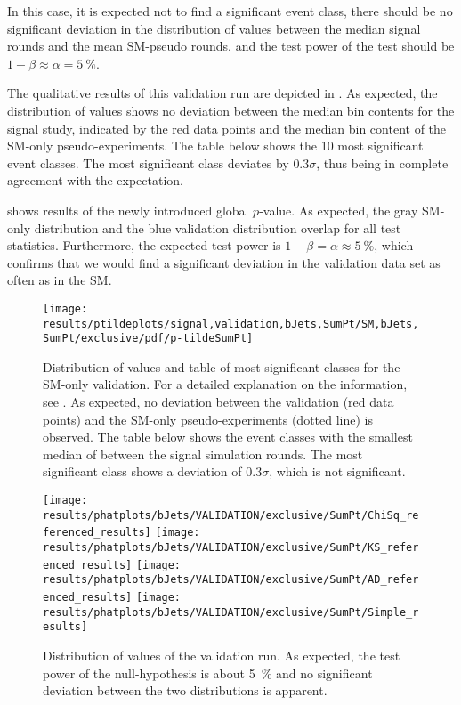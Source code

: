 In this case, it is expected not to find a significant event class, there should be no significant deviation in the distribution of \ptilde values between the median signal rounds and the mean \ac{SM}-pseudo rounds, and the test power of the \phat test should be $1 - \beta \approx \alpha = \SI{5}{\percent}$.

The qualitative results of this validation run are depicted in . As expected, the distribution of \ptilde values shows no deviation between the median bin contents for the signal study, indicated by the red data points and the median bin content of the \ac{SM}-only pseudo-experiments. The table below shows the \num{10} most significant event classes. The most significant class deviates by $\num{0.3}\sigma$, thus being in complete agreement with the expectation. 

 shows results of the newly introduced global $p$-value. As expected, the gray \ac{SM}-only distribution and the blue validation distribution overlap for all test statistics. Furthermore, the expected test power is $1 - \beta = \alpha \approx \SI{5}{\percent}$, which confirms that we would find a significant deviation in the validation data set as often as in the \ac{SM}.

\begin{figure}
    \centering
    \texttt{[image: results/ptildeplots/signal,validation,bJets,SumPt/SM,bJets,SumPt/exclusive/pdf/p-tildeSumPt]}
    {
        
    }
    \caption{Distribution of \ptilde values and table of most significant classes for the \ac{SM}-only validation. For a detailed explanation on the information, see . As expected, no deviation between the validation (red data points) and the \ac{SM}-only pseudo-experiments (dotted line) is observed. 
    The table below shows the event classes with the smallest median of \ptilde between the signal simulation rounds. The most significant class shows a deviation of $\num{0.3}\sigma$, which is not significant.}
    \label{fig:result_validation_ptilde}
\end{figure}

\begin{figure}
    \centering
    \texttt{[image: results/phatplots/bJets/VALIDATION/exclusive/SumPt/ChiSq\_referenced\_results]}
    \texttt{[image: results/phatplots/bJets/VALIDATION/exclusive/SumPt/KS\_referenced\_results]}
    \texttt{[image: results/phatplots/bJets/VALIDATION/exclusive/SumPt/AD\_referenced\_results]}
    \texttt{[image: results/phatplots/bJets/VALIDATION/exclusive/SumPt/Simple\_results]}
    \caption{Distribution of \TSphat values of the validation run. As expected, the test power of the null-hypothesis is about \SI{5}{\percent} and no significant deviation between the two distributions is apparent.}
    \label{fig:result_validation_phat}
\end{figure}

